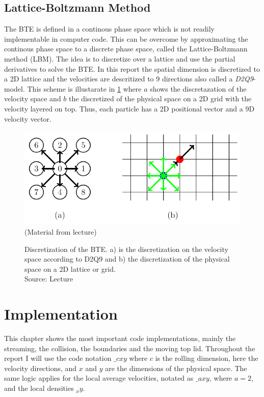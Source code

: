 \documentclass[a4paper,12pt, oneside]{book}
\begin{document}
\section{Lattice-Boltzmann Method} \label{sec:lbm}
The BTE is defined in a continous phase space which is not readily implementable in computer code.
This can be overcome by approximating the continous phase space to a discrete phase space, called the Lattice-Boltzmann method (LBM).
The idea is to discretize over a lattice and use the partial derivatives to solve the BTE.
In this report the spatial dimension is discretized to a 2D lattice and the velocities are descritized to 9 directions also called a \textit{D2Q9}-model.
This scheme is illustarate in \ref{fig:d2q9-scheme} where $a$ shows the discretazation of the velocity space and $b$ the discretized of the physical space on a 2D grid with the velocity layered on top. Thus, each particle has a 2D positional vector and a 9D velocity vector.
\begin{figure}[h]
  \centering
  \includegraphics[width=0.8\columnwidth]{d2q9_scheme.png}\\
  \small{(Material from lecture)}
  \caption[Discretization of the BTE]{Discretization of the BTE. a) is the discretization on the velocity space according to D2Q9 and b) the discretization of the physical space on a  2D lattice or grid.\\
  Source: Lecture}
  \label{fig:d2q9-scheme}
\end{figure}



\chapter{Implementation}
This chapter shows the most important code implementations, mainly the streaming, the collision, the boundaries and the moving top lid.
Throughout the report I will use the code notation $\_cxy$ where $c$ is the rolling dimension, here the velocity directions, and $x$ and $y$ are the dimensions of the physical space. The same logic applies for the local average velocities, notated as $\_axy$, where $a=2$, and the local densities $_xy$.
\end{document}
